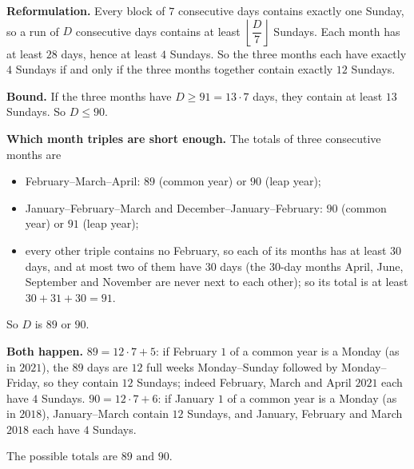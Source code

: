 \textbf{Reformulation.} Every block of $7$ consecutive days contains exactly one Sunday, so a run of $D$ consecutive days contains at least $\left\lfloor\dfrac {D}{7}\right\rfloor$ Sundays. Each month has at least $28$ days, hence at least $4$ Sundays. So the three months each have exactly $4$ Sundays if and only if the three months together contain exactly $12$ Sundays.

\textbf{Bound.} If the three months have $D\ge91=13\cdot7$ days, they contain at least $13$ Sundays. So $D\le90$.

\textbf{Which month triples are short enough.} The totals of three consecutive months are
\begin{itemize}
\item February--March--April: $89$ (common year) or $90$ (leap year);
\item January--February--March and December--January--February: $90$ (common year) or $91$ (leap year);
\item every other triple contains no February, so each of its months has at least $30$ days, and at most two of them have $30$ days (the $30$-day months April, June, September and November are never next to each other); so its total is at least $30+31+30=91$.
\end{itemize}
So $D$ is $89$ or $90$.

\textbf{Both happen.} $89=12\cdot7+5$: if February $1$ of a common year is a Monday (as in $2021$), the $89$ days are $12$ full weeks Monday--Sunday followed by Monday--Friday, so they contain $12$ Sundays; indeed February, March and April $2021$ each have $4$ Sundays. $90=12\cdot7+6$: if January $1$ of a common year is a Monday (as in $2018$), January--March contain $12$ Sundays, and January, February and March $2018$ each have $4$ Sundays.

The possible totals are $\boxed{89\text{ and }90}$.
